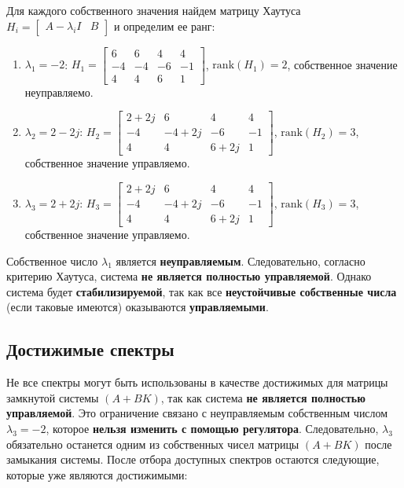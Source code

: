 Для каждого собственного значения найдем матрицу Хаутуса $H_i = \begin{bmatrix} A - \lambda_i I & B \end{bmatrix}$ и определим ее ранг:
\begin{enumerate}
    \item $\lambda_1 = -2$: $H_1 = \begin{bmatrix}
        6 & 6 & 4 & 4\\
        -4 & -4 & -6 & -1 \\
        4 & 4 & 6 & 1
    \end{bmatrix}$, $\text{rank}(H_1) = 2$, собственное значение неуправляемо.
    \item $\lambda_2 = 2-2j$: $H_2 = \begin{bmatrix}
        2+2j & 6 & 4 & 4\\
        -4 & -4+2j & -6 & -1 \\
        4 & 4 & 6+2j & 1
    \end{bmatrix}$, $\text{rank}(H_2) = 3$, собственное значение управляемо.
    \item $\lambda_3 = 2+2j$: $H_3 = \begin{bmatrix}
        2+2j & 6 & 4 & 4\\
        -4 & -4+2j & -6 & -1 \\
        4 & 4 & 6+2j & 1
    \end{bmatrix}$, $\text{rank}(H_3) = 3$, собственное значение управляемо.
\end{enumerate}

Собственное число $\lambda_1$ является \textbf{неуправляемым}. Следовательно, согласно критерию Хаутуса, система \textbf{не является полностью управляемой}.  
Однако система будет \textbf{стабилизируемой}, так как все \textbf{неустойчивые собственные числа} (если таковые имеются) оказываются \textbf{управляемыми}.

\subsection{Достижимые спектры}
Не все спектры могут быть использованы в качестве достижимых для матрицы замкнутой системы $(A + BK)$, так как система \textbf{не является полностью управляемой}. Это ограничение связано с неуправляемым собственным числом $\lambda_3 = -2$, которое \textbf{нельзя изменить с помощью регулятора}. Следовательно, $\lambda_3$ обязательно останется одним из собственных чисел матрицы $(A + BK)$ после замыкания системы. После отбора доступных спектров остаются следующие, которые уже являются достижимыми:

